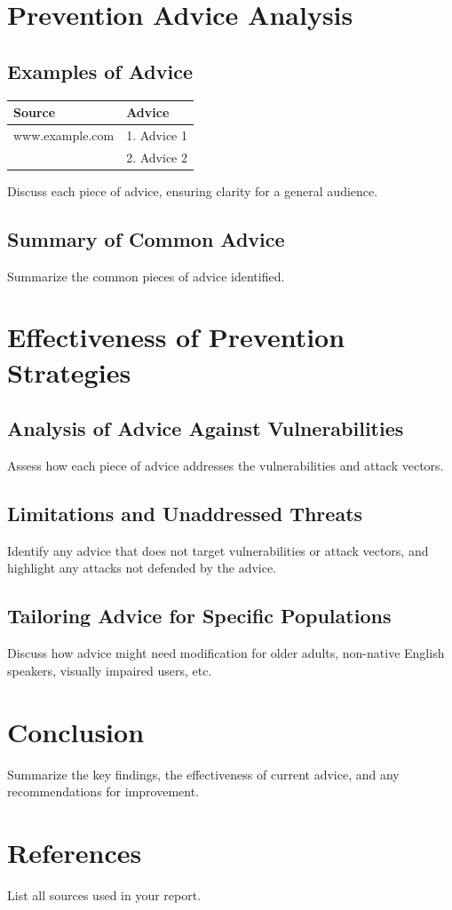 \documentclass[11pt]{article}
\begin{document}
\section{Prevention Advice Analysis}
\subsection{Examples of Advice}
\begin{tabular}{@{}ll@{}}
\toprule
\textbf{Source} & \textbf{Advice} \\ \midrule
www.example.com & 1. Advice 1 \\ 
                & 2. Advice 2 \\
\bottomrule
\end{tabular}

Discuss each piece of advice, ensuring clarity for a general audience.

\subsection{Summary of Common Advice}
Summarize the common pieces of advice identified.

\section{Effectiveness of Prevention Strategies}
\subsection{Analysis of Advice Against Vulnerabilities}
Assess how each piece of advice addresses the vulnerabilities and attack vectors.

\subsection{Limitations and Unaddressed Threats}
Identify any advice that does not target vulnerabilities or attack vectors, and highlight any attacks not defended by the advice.

\subsection{Tailoring Advice for Specific Populations}
Discuss how advice might need modification for older adults, non-native English speakers, visually impaired users, etc.

\section{Conclusion}
Summarize the key findings, the effectiveness of current advice, and any recommendations for improvement.

\section{References}
List all sources used in your report.
\end{document}
